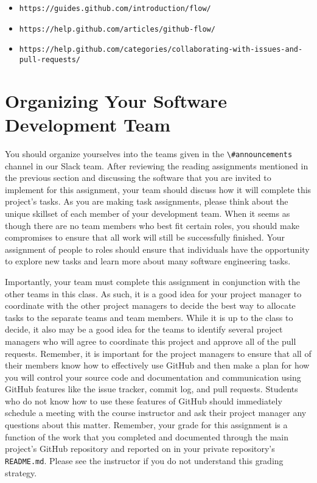 \documentclass[11pt]{article}
\newcommand{\reflection}{\lstinline{README.md}}
\newcommand{\url}[1]{\lstinline{#1}}
\newcommand{\channel}[1]{\lstinline{#1}}
\begin{document}
\vspace*{-.5em}

\begin{itemize}
  \setlength{\itemsep}{0pt}
  \item \url{https://guides.github.com/introduction/flow/}
  \item \url{https://help.github.com/articles/github-flow/}
  \item \url{https://help.github.com/categories/collaborating-with-issues-and-pull-requests/}
\end{itemize}

\vspace*{-1em}

\section*{Organizing Your Software Development Team}

You should organize yourselves into the teams given in the \channel{\#announcements} channel in our Slack team. After
reviewing the reading assignments mentioned in the previous section and discussing the software that you are invited to
implement for this assignment, your team should discuss how it will complete this project's tasks. As you are making
task assignments, please think about the unique skillset of each member of your development team. When it seems as
though there are no team members who best fit certain roles, you should make compromises to ensure that all work will
still be successfully finished. Your assignment of people to roles should ensure that individuals have the opportunity
to explore new tasks and learn more about many software engineering tasks.

Importantly, your team must complete this assignment in conjunction with the other teams in this class. As such, it is a
good idea for your project manager to coordinate with the other project managers to decide the best way to allocate
tasks to the separate teams and team members. While it is up to the class to decide, it also may be a good idea for the
teams to identify several project managers who will agree to coordinate this project and approve all of the pull
requests. Remember, it is important for the project managers to ensure that all of their members know how to effectively
use GitHub and then make a plan for how you will control your source code and documentation and communication using
GitHub features like the issue tracker, commit log, and pull requests. Students who do not know how to use these
features of GitHub should immediately schedule a meeting with the course instructor and ask their project manager any
questions about this matter. Remember, your grade for this assignment is a function of the work that you completed and
documented through the main project's GitHub repository and reported on in your private repository's \reflection{}.
Please see the instructor if you do not understand this grading strategy.
\end{document}
